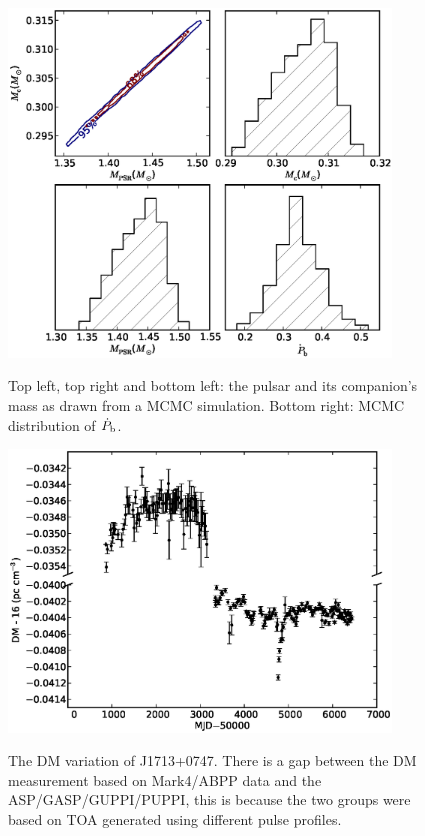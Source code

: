 \documentclass[12pt,preprint]{aastex}
\begin{document}
\begin{figure}
\includegraphics[width=4in]{masses.eps} \\ 
\caption {\label{fig:mass} Top left, top right and bottom left: the pulsar and its companion's mass as drawn from a MCMC simulation. Bottom right: MCMC distribution of $\dot{P}_{\rm b}$.} 
\end{figure} 

\begin{figure}
\includegraphics[width=4in]{DMX.ps} \\ 
\caption {\label{fig:dmx} The DM variation of J1713+0747. There is a gap
between the DM measurement based on Mark4/ABPP data and the
ASP/GASP/GUPPI/PUPPI, this is because the two groups were based on TOA  
generated using different pulse profiles. } 
\end{figure} 
\end{document}
